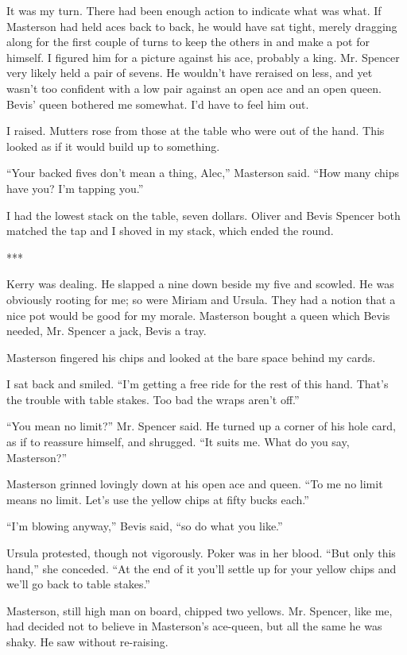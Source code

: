 \documentclass{novel}
\begin{document}
It was my turn. There had been enough action to indicate what was what. If Masterson had held aces back to back, he would have sat tight, merely dragging along for the first couple of turns to keep the others in and make a pot for himself. I figured him for a picture against his ace, probably a king. Mr. Spencer very likely held a pair of sevens. He wouldn’t have reraised on less, and yet wasn’t too confident with a low pair against an open ace and an open queen. Bevis’ queen bothered me somewhat. I’d have to feel him out.

I raised. Mutters rose from those at the table who were out of the hand. This looked as if it would build up to something.

“Your backed fives don’t mean a thing, Alec,” Masterson said. “How many chips have you? I’m tapping you.”

I had the lowest stack on the table, seven dollars. Oliver and Bevis Spencer both matched the tap and I shoved in my stack, which ended the round.

***

Kerry was dealing. He slapped a nine down beside my five and scowled. He was obviously rooting for me; so were Miriam and Ursula. They had a notion that a nice pot would be good for my morale. Masterson bought a queen which Bevis needed, Mr. Spencer a jack, Bevis a tray.

Masterson fingered his chips and looked at the bare space behind my cards.

I sat back and smiled. “I’m getting a free ride for the rest of this hand. That’s the trouble with table stakes. Too bad the wraps aren’t off.”

“You mean no limit?” Mr. Spencer said. He turned up a corner of his hole card, as if to reassure himself, and shrugged. “It suits me. What do you say, Masterson?”

Masterson grinned lovingly down at his open ace and queen. “To me no limit means no limit. Let’s use the yellow chips at fifty bucks each.”

“I’m blowing anyway,” Bevis said, “so do what you like.”

Ursula protested, though not vigorously. Poker was in her blood. “But only this hand,” she conceded. “At the end of it you’ll settle up for your yellow chips and we’ll go back to table stakes.”

Masterson, still high man on board, chipped two yellows. Mr. Spencer, like me, had decided not to believe in Masterson’s ace-queen, but all the same he was shaky. He saw without re-raising.
\end{document}
